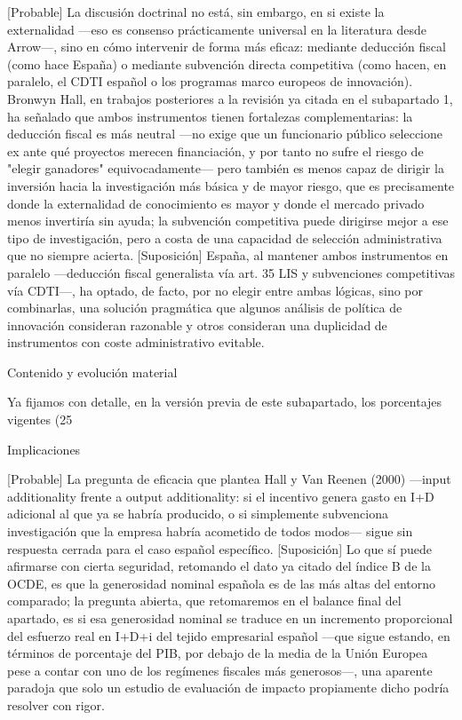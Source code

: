 \documentclass[10pt,a4paper]{article}
\begin{document}
[Probable] La discusión doctrinal no está, sin embargo, en si existe la externalidad —eso es consenso prácticamente universal en la literatura desde Arrow—, sino en cómo intervenir de forma más eficaz: mediante deducción fiscal (como hace España) o mediante subvención directa competitiva (como hacen, en paralelo, el CDTI español o los programas marco europeos de innovación). Bronwyn Hall, en trabajos posteriores a la revisión ya citada en el subapartado 1, ha señalado que ambos instrumentos tienen fortalezas complementarias: la deducción fiscal es más neutral —no exige que un funcionario público seleccione ex ante qué proyectos merecen financiación, y por tanto no sufre el riesgo de "elegir ganadores" equivocadamente— pero también es menos capaz de dirigir la inversión hacia la investigación más básica y de mayor riesgo, que es precisamente donde la externalidad de conocimiento es mayor y donde el mercado privado menos invertiría sin ayuda; la subvención competitiva puede dirigirse mejor a ese tipo de investigación, pero a costa de una capacidad de selección administrativa que no siempre acierta. [Suposición] España, al mantener ambos instrumentos en paralelo —deducción fiscal generalista vía art. 35 LIS y subvenciones competitivas vía CDTI—, ha optado, de facto, por no elegir entre ambas lógicas, sino por combinarlas, una solución pragmática que algunos análisis de política de innovación consideran razonable y otros consideran una duplicidad de instrumentos con coste administrativo evitable.

Contenido y evolución material

Ya fijamos con detalle, en la versión previa de este subapartado, los porcentajes vigentes (25%

Implicaciones

[Probable] La pregunta de eficacia que plantea Hall y Van Reenen (2000) —input additionality frente a output additionality: si el incentivo genera gasto en I+D adicional al que ya se habría producido, o si simplemente subvenciona investigación que la empresa habría acometido de todos modos— sigue sin respuesta cerrada para el caso español específico. [Suposición] Lo que sí puede afirmarse con cierta seguridad, retomando el dato ya citado del índice B de la OCDE, es que la generosidad nominal española es de las más altas del entorno comparado; la pregunta abierta, que retomaremos en el balance final del apartado, es si esa generosidad nominal se traduce en un incremento proporcional del esfuerzo real en I+D+i del tejido empresarial español —que sigue estando, en términos de porcentaje del PIB, por debajo de la media de la Unión Europea pese a contar con uno de los regímenes fiscales más generosos—, una aparente paradoja que solo un estudio de evaluación de impacto propiamente dicho podría resolver con rigor.
\end{document}
